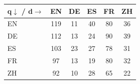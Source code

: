 \begin{tabular}{lccccc}
\toprule
\textbf{q$\downarrow$ / d$\rightarrow$} & EN & DE & ES & FR & ZH \\
\midrule
EN & \cellcolor{gray!15}119 & 11 & 40 & 80 & 36 \\
DE & 112 & \cellcolor{gray!15}13 & 24 & 90 & 39 \\
ES & 103 & 23 & \cellcolor{gray!15}27 & 78 & 31 \\
FR & 97 & 13 & 19 & \cellcolor{gray!15}80 & 32 \\
ZH & 92 & 10 & 28 & 65 & \cellcolor{gray!15}22 \\
\bottomrule
\end{tabular}

